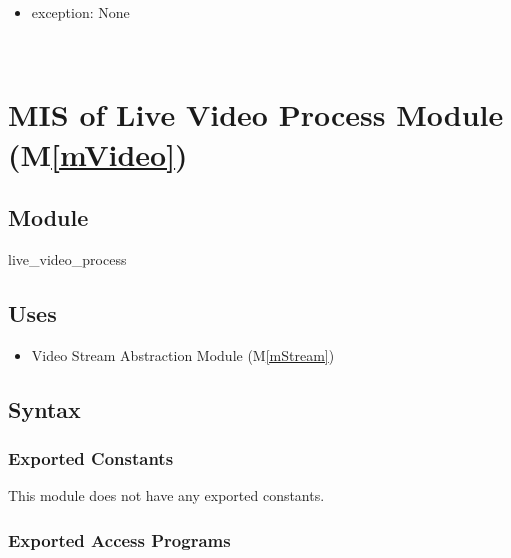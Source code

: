 \documentclass[12pt, titlepage]{article}
\newcommand{\mref}[1]{M\ref{#1}}
\begin{document}
\begin{itemize}
\begin{itemize}
\begin{itemize}
\begin{itemize}
\begin{itemize}
                                  \item \texttt{frame\_number}: The frame number.
                                  \item \texttt{average\_fps}: The average FPS of the video.
                                  \item \texttt{bbox}: The detected rocket location.
                                  \item \texttt{preview}: encoded preview JPEG image.
                                \end{itemize}
                        \end{itemize}
                \end{itemize}
        \end{itemize}
  \item exception: None
\end{itemize}

\ \

\section{MIS of Live Video Process Module (\mref{mVideo})}

\subsection{Module}

live\_video\_process

\subsection{Uses}

\begin{itemize}
  \item Video Stream Abstraction Module (\mref{mStream})
\end{itemize}

\subsection{Syntax}

\subsubsection{Exported Constants}

This module does not have any exported constants.

\subsubsection{Exported Access Programs}
\end{document}
